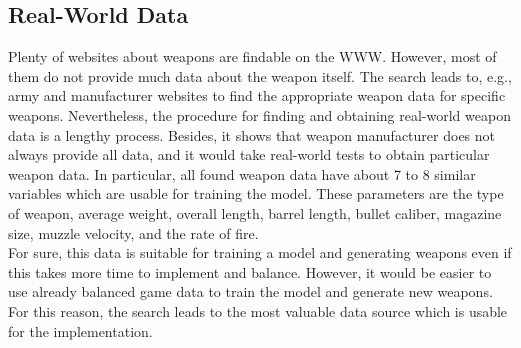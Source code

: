\documentclass[MGS,Master,english]{twbook}%
\begin{document}
\subsection{Real-World Data}
Plenty of websites about weapons are findable on the \ac{WWW}. However, most of them do not provide much data about the weapon itself. The search leads to, e.g., army and manufacturer websites to find the appropriate weapon data for specific weapons. Nevertheless, the procedure for finding and obtaining real-world weapon data is a lengthy process. Besides, it shows that weapon manufacturer does not always provide all data, and it would take real-world tests to obtain particular weapon data. In particular, all found weapon data have about 7 to 8 similar variables which are usable for training the model. These parameters are the type of weapon, average weight, overall length, barrel length, bullet caliber, magazine size, muzzle velocity, and the rate of fire.\\
For sure, this data is suitable for training a model and generating weapons even if this takes more time to implement and balance. However, it would be easier to use already balanced game data to train the model and generate new weapons. For this reason, the search leads to the most valuable data source which is usable for the implementation.
\end{document}
